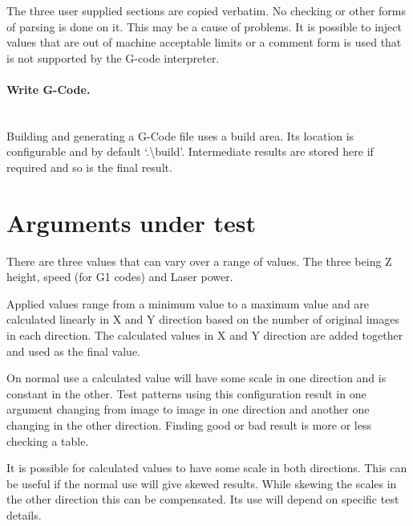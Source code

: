 The three user supplied sections are copied verbatim. No checking or other forms of parsing is done on it.
This may be a cause of problems. It is possible to inject values that are out of machine acceptable limits
or a comment form is used that is not supported by the G-code interpreter.

\WarningCheckAndTest

\paragraph{Write G-Code.}~\\
Building and generating a G-Code file uses a build area. Its location is configurable and by default
`.\textbackslash{}build'. Intermediate results are stored here if required and so is the final result.


\section{Arguments under test}
There are three values that can vary over a range of values.
The three being Z height,
speed (for G1 codes)
and Laser power.

Applied values range from a minimum value to a maximum value and are calculated linearly in X and Y direction
based on the number of original images in each direction. The calculated values in X and Y
direction are added together and used as the final value.

On normal use a calculated value will have some scale in one direction and is constant in the other. Test patterns
using this configuration result in one argument changing from image to image in one direction and another one
changing in the other direction. Finding good or bad result is more or less checking a table.

It is possible for calculated values to have some scale in both directions. This can be useful if the normal use
will give skewed results. While skewing the scales in the other direction this can be compensated. Its use will
depend on specific test details.